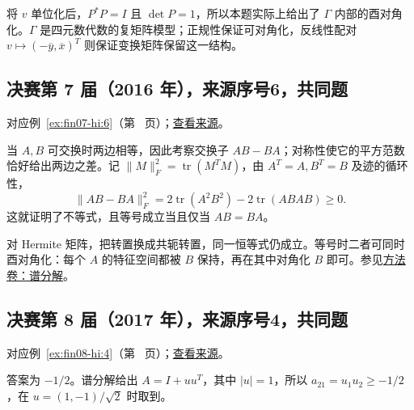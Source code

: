 \documentclass[12pt,fontset=fandol]{ctexart}
\begin{document}
\begin{remark}[方法与条件]

将 $v$ 单位化后，$P^*P=I$ 且 $\det P=1$，所以本题实际上给出了 $\Gamma$ 内部的酉对角化。$\Gamma$ 是四元数代数的复矩阵模型；正规性保证可对角化，反线性配对 $v\mapsto(-\overline y,\overline x)^T$ 则保证变换矩阵保留这一结构。

\end{remark}

\subsection{决赛第 7 届（2016 年），来源序号6，共同题}\label{ans:fin07-hi:6}\label{pr:fin07-hi:6}

对应例~\ref{ex:fin07-hi:6}（第~\pageref{ex:fin07-hi:6} 页）；\href{https://github.com/lzxcr/cmc-mathematics/blob/64916fa1fdbc3e444a652eca204d5669058ee321/src/problems/finals/07/06.md}{查看来源}。

\begin{solve}

当 $A,B$ 可交换时两边相等，因此考察交换子 $AB-BA$；对称性使它的平方范数恰好给出两边之差。记 $\|M\|_F^2=\operatorname{tr}(M^TM)$，由 $A^T=A,B^T=B$ 及迹的循环性，
\[
\|AB-BA\|_F^2=2\operatorname{tr}(A^2B^2)-2\operatorname{tr}(ABAB)\geq0.
\]
这就证明了不等式，且等号成立当且仅当 $AB=BA$。

\end{solve}

\begin{remark}[方法与条件]

对 Hermite 矩阵，把转置换成共轭转置，同一恒等式仍成立。等号时二者可同时酉对角化：每个 $A$ 的特征空间都被 $B$ 保持，再在其中对角化 $B$ 即可。参见\hyperref[app:linear-spectral]{方法卷：谱分解}。

\end{remark}

\subsection{决赛第 8 届（2017 年），来源序号4，共同题}\label{ans:fin08-hi:4}\label{pr:fin08-hi:4}

对应例~\ref{ex:fin08-hi:4}（第~\pageref{ex:fin08-hi:4} 页）；\href{https://github.com/lzxcr/cmc-mathematics/blob/64916fa1fdbc3e444a652eca204d5669058ee321/src/problems/finals/08/04.md}{查看来源}。

\begin{solve}

答案为 $-1/2$。谱分解给出 $A=I+uu^T$，其中 $|u|=1$，所以 $a_{21}=u_1u_2\geq-1/2$，在 $u=(1,-1)/\sqrt2$ 时取到。

\end{solve}
\end{document}
